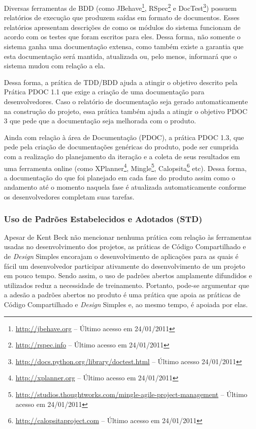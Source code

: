 Diversas ferramentas de BDD (como
JBehave\footnote{\url{http://jbehave.org} -- Último acesso em
  24/01/2011}, RSpec\footnote{\url{http://rspec.info} -- Último acesso em
  24/01/2011} e
DocTest\footnote{\url{http://docs.python.org/library/doctest.html} --
  Último acesso 24/01/2011}) possuem relatórios de execução que
produzem saídas em formato de documentos. Esses relatórios apresentam
descrições de como os módulos do sistema funcionam de acordo com os
testes que foram escritos para eles. Dessa forma, não somente o
sistema ganha uma documentação extensa, como também existe a garantia
que esta documentação será mantida, atualizada ou, pelo menos,
informará que o sistema mudou com relação a ela.

Dessa forma, a prática de TDD/BDD ajuda a atingir o objetivo descrito
pela Prática PDOC 1.1 que exige a criação de uma documentação para
desenvolvedores. Caso o relatório de documentação seja gerado
automaticamente na construção do projeto, essa prática também ajuda a
atingir o objetivo PDOC 3 que pede que a documentação seja melhorada
com o produto.

Ainda com relação à área de Documentação (PDOC), a prática PDOC 1.3,
que pede pela criação de documentações genéricas do produto, pode ser
cumprida com a realização do planejamento da iteração e a coleta de
seus resultados em uma ferramenta online (como
XPlanner\footnote{\url{http://xplanner.org} -- Último acesso em
  24/01/2011},
Mingle\footnote{\url{http://studios.thoughtworks.com/mingle-agile-project-management}
  -- Último acesso em 24/01/2011},
Calopsita\footnote{\url{http://calopsitaproject.com} -- Último acesso
  em 24/01/2011} etc). Dessa forma, a documentação do que foi
planejado em cada fase do produto assim como o andamento até o momento
naquela fase é atualizada automaticamente conforme os desenvolvedores
completam suas tarefas.

\subsubsection{Uso de Padrões Estabelecidos e Adotados (STD)}
\label{sec:+std}

Apesar de Kent Beck não mencionar nenhuma prática com relação às
ferramentas usadas no desenvolvimento dos projetos, as práticas de
Código Compartilhado e de \textit{Design} Simples encorajam o
desenvolvimento de aplicações para as quais é fácil um desenvolvedor
participar ativamente do desenvolvimento de um projeto em pouco
tempo. Sendo assim, o uso de padrões abertos amplamente difundidos e
utilizados reduz a necessidade de treinamento.  Portanto, pode-se
argumentar que a adesão a padrões abertos no produto é uma prática que
apoia as práticas de Código Compartilhado e \textit{Design} Simples e,
ao mesmo tempo, é apoiada por elas.

